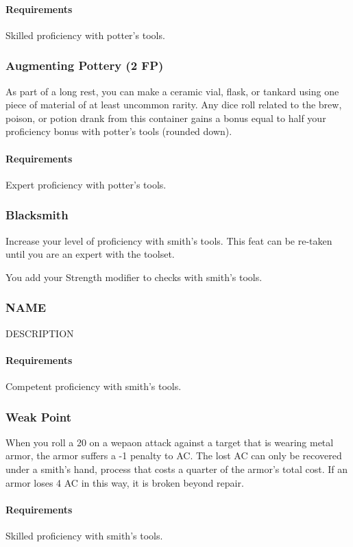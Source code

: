     \paragraph{Requirements} Skilled proficiency with potter's tools.
\subsubsection{Augmenting Pottery (2 FP)} \label{feat::augmentingpottery}
    As part of a long rest, you can make a ceramic vial, flask, or tankard using one piece of material of at least uncommon rarity.
    Any dice roll related to the brew, poison, or potion drank from this container gains a bonus equal to half your proficiency bonus with potter's tools (rounded down).
    \paragraph{Requirements} Expert proficiency with potter's tools.

\subsubsection{Blacksmith} \label{feat::blacksmith}
    Increase your level of proficiency with smith's tools.
    This feat can be re-taken until you are an expert with the toolset.

    You add your Strength modifier to checks with smith's tools.
\subsubsection{NAME} \label{feat::name}
    DESCRIPTION
    \paragraph{Requirements} Competent proficiency with smith's tools.
\subsubsection{Weak Point} \label{feat::weakpoint}
    When you roll a 20 on a wepaon attack against a target that is wearing metal armor, the armor suffers a -1 penalty to AC.
    The lost AC can only be recovered under a smith's hand, process that costs a quarter of the armor's total cost.
    If an armor loses 4 AC in this way, it is broken beyond repair.
    \paragraph{Requirements} Skilled proficiency with smith's tools.
